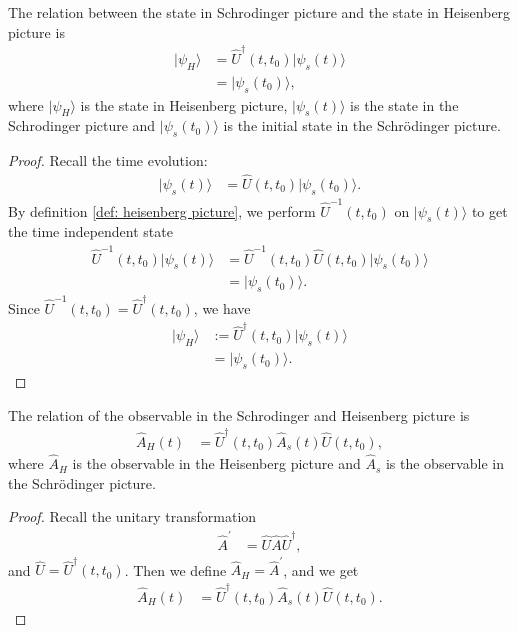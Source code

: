 \documentclass[../../note.tex]{subfiles}
\begin{document}
\begin{lemma}
    \label{lemma: state relation}
    The relation between the state in Schrodinger picture and the state in Heisenberg picture is 
    \begin{align}
        \vert \psi_H \rangle
        &= \hat{U}^\dagger(t,t_0) \vert \psi_s(t)\rangle \\
        &= \vert \psi_s(t_0) \rangle,
    \end{align}
    where $\vert \psi_H \rangle$ is the state in Heisenberg picture, $\vert \psi_s(t) \rangle$ is the state in the Schrodinger picture and $\vert \psi_s(t_0) \rangle$ is the initial state in the Schrödinger picture.
\end{lemma}
\begin{proof}
    Recall the time evolution:
    \begin{align}
        \vert \psi_s(t) \rangle
        &= \hat{U}(t,t_0) \vert \psi_s(t_0) \rangle.
    \end{align}
    By definition \ref{def: heisenberg picture}, we perform $\hat{U}^{-1}(t,t_0)$ on $\vert \psi_s(t) \rangle$ to get the time independent state
    \begin{align}
        \hat{U}^{-1}(t,t_0) \vert \psi_s(t) \rangle
        &= \hat{U}^{-1}(t,t_0) \hat{U}(t,t_0) \vert \psi_s(t_0) \rangle \\
        &= \vert \psi_s(t_0) \rangle.
    \end{align}
    Since $\hat{U}^{-1}(t,t_0) = \hat{U}^\dagger(t,t_0)$, we have
    \begin{align}
        \vert \psi_H \rangle
        &:= \hat{U}^\dagger(t,t_0) \vert \psi_s(t) \rangle \\
        &= \vert \psi_s(t_0) \rangle.
    \end{align}
\end{proof}

\begin{lemma}
    \label{lemma: observable relation}
    The relation of the observable in the Schrodinger and Heisenberg picture is
    \begin{align}
        \hat{A}_H(t)
        &= \hat{U}^\dagger(t,t_0) \hat{A}_s(t) \hat{U}(t,t_0),
    \end{align}
    where $\hat{A}_H$ is the observable in the Heisenberg picture and $\hat{A}_s$ is the observable in the Schrödinger picture.
\end{lemma}
\begin{proof}
    Recall the unitary transformation
    \begin{align}
        \hat{A}^\prime
        &= \hat{U} \hat{A} \hat{U}^\dagger,
    \end{align}
    and $\hat{U} = \hat{U}^\dagger(t,t_0)$. Then we define $\hat{A}_H = \hat{A}^\prime$, and we get 
    \begin{align}
        \hat{A}_H(t)
        &= \hat{U}^\dagger(t,t_0) \hat{A}_s(t) \hat{U}(t,t_0).
    \end{align}
\end{proof}
\end{document}
